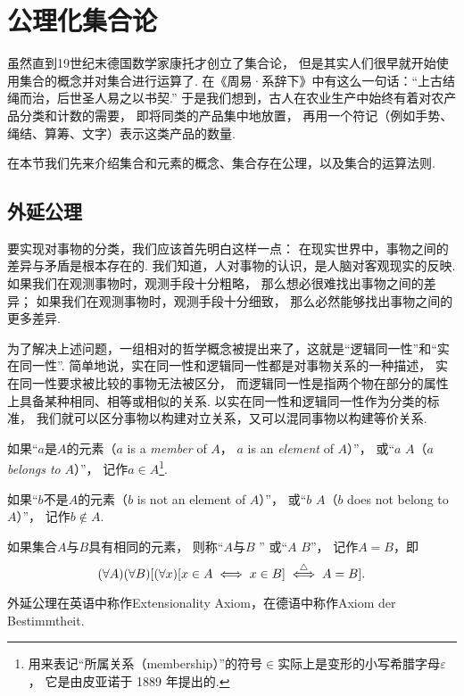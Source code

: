 
\section{公理化集合论}
虽然直到19世纪末德国数学家康托才创立了集合论，
但是其实人们很早就开始使用集合的概念并对集合进行运算了.
在《周易·系辞下》中有这么一句话：“上古结绳而治，后世圣人易之以书契.”
于是我们想到，古人在农业生产中始终有着对农产品分类和计数的需要，
即将同类的产品集中地放置，
再用一个符记（例如手势、绳结、算筹、文字）表示这类产品的数量.

在本节我们先来介绍集合和元素的概念、集合存在公理，以及集合的运算法则.

\subsection{外延公理}
要实现对事物的分类，我们应该首先明白这样一点：
在现实世界中，事物之间的差异与矛盾是根本存在的.
我们知道，人对事物的认识，是人脑对客观现实的反映.
如果我们在观测事物时，观测手段十分粗略，
那么想必很难找出事物之间的差异；
如果我们在观测事物时，观测手段十分细致，
那么必然能够找出事物之间的更多差异.

为了解决上述问题，一组相对的哲学概念被提出来了，这就是“逻辑同一性”和“实在同一性”.
简单地说，实在同一性和逻辑同一性都是对事物关系的一种描述，
实在同一性要求被比较的事物无法被区分，
而逻辑同一性是指两个物在部分的属性上具备某种相同、相等或相似的关系.
以实在同一性和逻辑同一性作为分类的标准，
我们就可以区分事物以构建对立关系，又可以混同事物以构建等价关系.

\begin{definition}
如果“\(a\)是\(A\)的元素（\(a\) is a \emph{member} of \(A\)，
\(a\) is an \emph{element} of \(A\)）”，
或“\(a\)  \(A\)（\(a\) \emph{belongs to} \(A\)）”，
记作\(a \in A\)\footnote{%
用来表记“所属关系（membership）”的符号\(\in\)实际上是变形的小写希腊字母\(\varepsilon\)，%
它是由皮亚诺于 1889 年提出的.}.
\end{definition}

\begin{definition}
如果“\(b\)不是\(A\)的元素（\(b\) is not an element of \(A\)）”，%
或“\(b\)  \(A\)（\(b\) does not belong to \(A\)）”，%
记作\(b \notin A\).
\end{definition}

\begin{axiom}[外延公理I]
如果集合\(A\)与\(B\)具有相同的元素，
则称“\(A\)与\(B\) ”
或“\(A\)  \(B\)”，
记作\(A=B\)，即
\[
	(\forall A)(\forall B)[
		(\forall x)[x \in A \iff x \in B]
		\overset{\triangle}{\iff}
		A=B
	].
\]
\end{axiom}
外延公理在英语中称作Extensionality Axiom，在德语中称作Axiom der Bestimmtheit.

